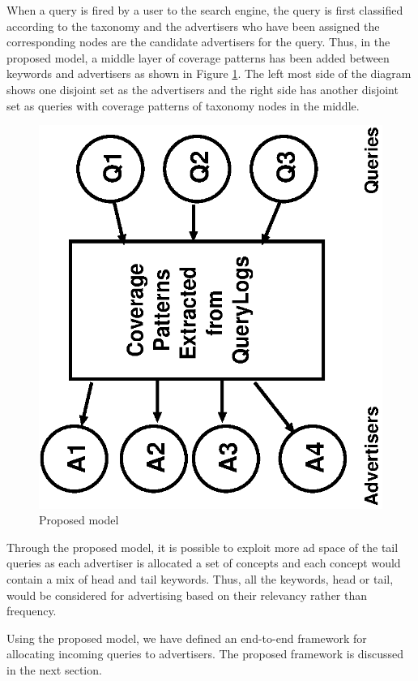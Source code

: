 When a query is fired by a user to the search engine, the query is first classified according to the taxonomy and the advertisers who have been assigned the corresponding nodes are the candidate advertisers for the query. Thus, in the proposed model, a middle layer of coverage patterns has been added between keywords and advertisers as shown in Figure \ref{fig:proposedModelJournal}. The left most side of the diagram shows one disjoint set as the advertisers and the right side has another disjoint set as queries with coverage patterns of taxonomy nodes in the middle. 
\begin{figure}
	\centering
\includegraphics[scale=0.3,angle = 270]{visuals/proposedModelDSAA.eps}
	\caption{Proposed model }
	\label{fig:proposedModelJournal}
\end{figure}

Through the proposed model, it is possible to exploit more ad space of the tail queries as each advertiser is allocated a set of concepts and each concept would contain a mix of head and tail keywords. Thus, all the keywords, head or tail, would be considered for advertising based on their relevancy rather than frequency.

Using the proposed model, we have defined an end-to-end framework for allocating incoming queries to advertisers. The proposed framework is discussed in the next section.






